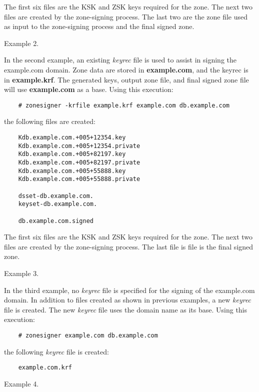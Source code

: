 The first six files are the KSK and ZSK keys required for the zone.  The next
two files are created by the zone-signing process.  The last two are the zone
file used as input to the zone-signing process and the final signed zone.

Example 2.

In the second example, an existing {\it keyrec} file is used to assist in
signing the example.com domain.  Zone data are stored in {\bf example.com},
and the keyrec is in {\bf example.krf}.  The generated keys, output zone file,
and final signed zone file will use {\bf example.com} as a base.  Using this
execution:

\begin{verbatim}    # zonesigner -krfile example.krf example.com db.example.com\end{verbatim}

the following files are created:

\begin{verbatim}
    Kdb.example.com.+005+12354.key
    Kdb.example.com.+005+12354.private
    Kdb.example.com.+005+82197.key
    Kdb.example.com.+005+82197.private
    Kdb.example.com.+005+55888.key
    Kdb.example.com.+005+55888.private

    dsset-db.example.com.
    keyset-db.example.com.

    db.example.com.signed
\end{verbatim}

The first six files are the KSK and ZSK keys required for the zone.  The next
two files are created by the zone-signing process.  The last file is file is
the final signed zone.

Example 3.

In the third example, no {\it keyrec} file is specified for the signing of
the example.com domain.  In addition to files created as shown in previous
examples, a new {\it keyrec} file is created.  The new {\it keyrec} file uses
the domain name as its base.  Using this execution:

\begin{verbatim}    # zonesigner example.com db.example.com\end{verbatim}

the following {\it keyrec} file is created:

\begin{verbatim}    example.com.krf\end{verbatim}

Example 4.

